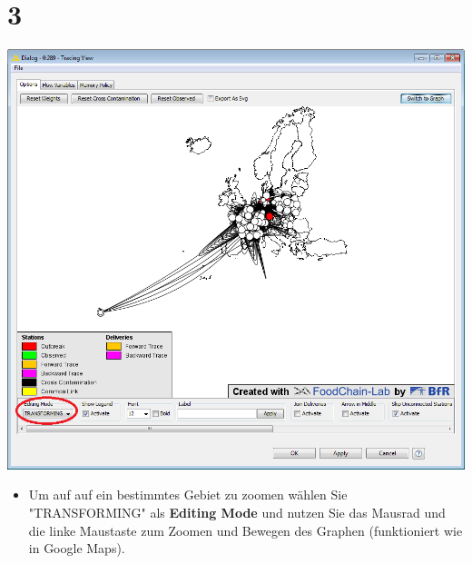 \documentclass{beamer}
\begin{document}
\section{3}
\begin{frame}
	\begin{center}
  		\includegraphics[height=0.6\textheight]{3.png}
	\end{center}
	\begin{itemize}
		\item Um auf auf ein bestimmtes Gebiet zu zoomen wählen Sie "TRANSFORMING" als \textbf{Editing Mode} und nutzen Sie das Mausrad und die linke Maustaste zum Zoomen und Bewegen des Graphen (funktioniert wie in Google Maps).
	\end{itemize}
\end{frame}
\end{document}
